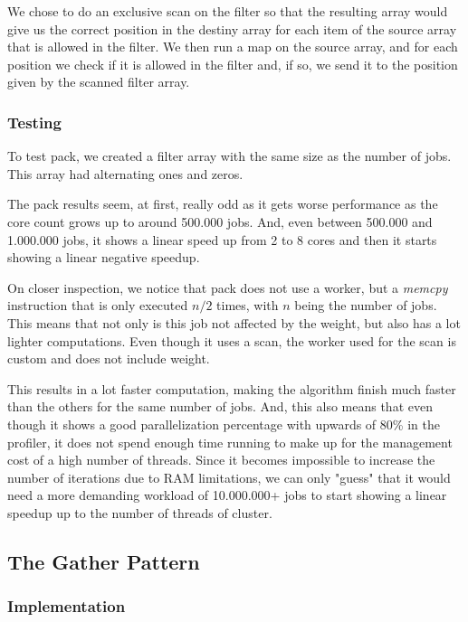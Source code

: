 \documentclass[9pt,journal]{IEEEtran}
\begin{document}
We chose to do an exclusive scan on the filter so that the resulting array would give us the correct position in the destiny array for each item of the source array that is allowed in the filter. We then run a map on the source array, and for each position we check if it is allowed in the filter and, if so, we send it to the position given by the scanned filter array.

\subsubsection{Testing}

To test pack, we created a filter array with the same size as the number of jobs. This array had alternating ones and zeros.

The pack results seem, at first, really odd as it gets worse performance as the core count grows up to around 500.000 jobs. And, even between 500.000 and 1.000.000 jobs, it shows a linear speed up from 2 to 8 cores and then it starts showing a linear negative speedup.

On closer inspection, we notice that pack does not use a worker, but a \textit{memcpy} instruction that is only executed $ n / 2 $ times, with $ n $ being the number of jobs. This means that not only is this job not affected by the weight, but also has a lot lighter computations. Even though it uses a scan, the worker used for the scan is custom and does not include weight.

This results in a lot faster computation, making the algorithm finish much faster than the others for the same number of jobs. And, this also means that even though it shows a good parallelization percentage with upwards of 80\% in the profiler, it does not spend enough time running to make up for the management cost of a high number of threads. Since it becomes impossible to increase the number of iterations due to RAM limitations, we can only "guess" that it would need a more demanding workload of 10.000.000+ jobs to start showing a linear speedup up to the number of threads of cluster.

\subsection{The Gather Pattern}
\label{gather}

\subsubsection{Implementation}
\end{document}
